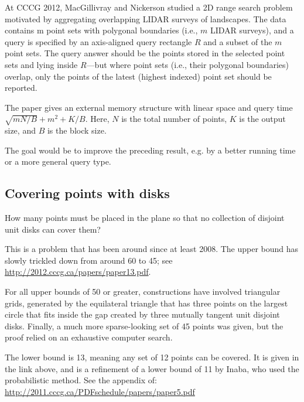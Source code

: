 \documentclass{patmorin}
\newcommand{\poser}[1]{\noindent{\textit{#1}}}
\begin{document}
At CCCG 2012, MacGillivray and Nickerson studied a 2D range search
problem motivated by aggregating overlapping LIDAR surveys of
landscapes. The data contains m point sets with polygonal boundaries
(i.e., $m$ LIDAR surveys), and a query is specified by an axis-aligned
query rectangle $R$ and a subset of the $m$ point sets. The query answer
should be the points stored in the selected point sets and lying inside
$R$---but where point sets (i.e., their polygonal boundaries) overlap,
only the points of the latest (highest indexed) point set should be
reported.

The paper gives an external memory structure with linear space and query
time $\sqrt{mN/B} + m^2 + K/B$. Here, $N$ is the total number of points, $K$ is
the output size, and $B$ is the block size.

\begin{op}
  The goal would be to improve the preceding result, e.g. by a better
  running time or a more general query type.
\end{op}


\subsection{Covering points with  disks}  

\poser{Greg Aloupis}


\begin{op}
  How many points must be placed in the plane so that no collection of
  disjoint unit disks can cover them?
\end{op}


This is a problem that has been around since at least 2008.
The upper bound has slowly trickled down from around 60 to 45; see
\url{http://2012.cccg.ca/papers/paper13.pdf}.

For all upper bounds of 50 or greater,  constructions have  involved
triangular grids, generated by the equilateral triangle that has
three points on the largest  circle that fits inside the gap created
by three mutually tangent unit disjoint disks.  Finally, a much more
sparse-looking set of 45 points was given, but the proof relied on an
exhaustive computer search.

The lower bound is 13, meaning any set of 12 points can be covered.
It is given in the link above, and is a refinement of a lower bound of
11 by  Inaba, who used the probabilistic method. See the appendix of:
\url{http://2011.cccg.ca/PDFschedule/papers/paper5.pdf}
\end{document}
